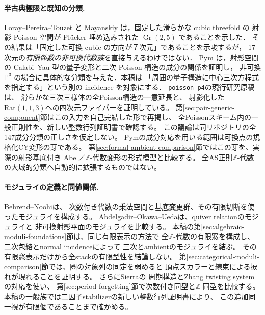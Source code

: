 \documentclass[11pt,a4paper]{ltjsarticle}
\numberwithin{equation}{section}
\newcommand{\PP}{\mathbb P}
\begin{document}
\paragraph{半古典極限と既知の分類.}
Loray--Pereira--Touzet \cite[Theorem~9.1]{LPT} と
Mayanskiy \cite[Theorem~1]{Mayanskiy} は，固定した滑らかな cubic threefold の
射影 Poisson 空間が Pl\"ucker 埋め込みされた $\operatorname{Gr}(2,5)$ であることを示した．
その結果は「固定した可換 cubic の方向が７次元」であることを示唆するが，
17次元の\emph{有限係数の非可換代数族}を直接与えるわけではない．
Pym \cite[Proposition~2.9, Theorem~2.10]{Pym} は，射影空間の
Calabi--Yau 型の量子変形と二次 Poisson 構造の成分の関係を証明し，
非可換 $\PP^3$ の場合に具体的な分類を与えた．本稿は
「周囲の量子構造に中心三次方程式を指定する」という別の incidence を対象にする．
\texttt{poisson-p4}の現行研究原稿\cite{PoissonP4Incidence}は、
滑らかな三次三様体の全Poisson構造の一意延長と、
射影化した$\mathrm{Rat}(1,1,3)$への四次元ファイバーを証明している。
第\ref{sec:pair-generic-component}節はこの入力を自己完結した形で再掲し、
全Poissonスキーム内の一般正則性を、新しい整数行列証明書で確認する。
この議論は同リポジトリの全147成分分類の正しさを仮定しない。
Pymの成分対応を用いる範囲は可換点の規格化CY変形の芽である。
第\ref{sec:formal-ambient-comparison}節ではこの芽を、実際の射影基底付き
Abel／$\mathbb Z$-代数変形の形式模型と比較する。
全AS正則$\mathbb Z$-代数の大域的分類へ自動的に拡張するものではない。

\paragraph{モジュライの定義と同値関係.}
Behrend--Noohi\cite[\S\S2.3,2.5]{BehrendNoohiModuli}は、
次数付き代数の乗法空間と基底変更群、その有限切断を使ったモジュライを構成する。
Abdelgadir--Okawa--Ueda\cite{AOUNCPlanes}は、quiver relationのモジュライと
非可換射影平面のモジュライを比較する。
本稿の第\ref{sec:algebraic-moduli-foundations}節は、同じ有限表示の方法で
全$\mathbb Z$-代数の有限窓を構成し、二次包絡とnormal incidenceによって
三次とambientのモジュライを結ぶ。
その有限窓表示だけから全stackの有限型性を結論しない。
第\ref{sec:categorical-moduli-comparison}節では、圏の対象列の同定を弱めると
頂点スカラーと線束による捩れが現れることを証明する。
さらにSierra\cite[Proposition~3.3, Corollary~4.4]{SierraGAlgebras}の
周期構造とZhang twisting systemの対応を使い、
第\ref{sec:period-forgetting}節で次数付き同型と$\mathbb Z$-同型を比較する。
本稿の一般族では二因子stabilizerの新しい整数行列証明書により、
この追加同一視が有限個であることまで確かめる。
\end{document}
